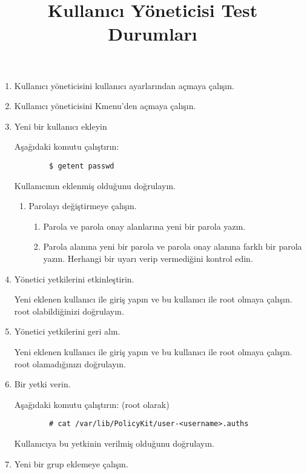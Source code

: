 \documentclass[a4paper,10pt]{article}
\title{Kullanıcı Yöneticisi Test Durumları}
\begin{document}
\maketitle
\begin{enumerate}

\item Kullanıcı yöneticisini kullanıcı ayarlarından açmaya çalışın.

\item Kullanıcı yöneticisini Kmenu'den açmaya çalışın.

\item Yeni bir kullanıcı ekleyin

    Aşağıdaki komutu çalıştırın:
    \begin{verbatim}
        $ getent passwd 
    \end{verbatim}
    Kullanıcının eklenmiş olduğunu doğrulayın.

    \begin{enumerate}
    \item Parolayı değiştirmeye çalışın.
        \begin{enumerate}
        \item Parola ve parola onay alanlarına yeni bir parola yazın.
        \item Parola alanına yeni bir parola ve parola onay alanına farklı bir parola yazın. Herhangi bir uyarı verip vermediğini kontrol edin.
        \end{enumerate}
    \end{enumerate}

    \item Yönetici yetkilerini etkinleştirin.

          Yeni eklenen kullanıcı ile giriş yapın ve bu kullanıcı ile root olmaya çalışın. root olabildiğinizi doğrulayın.
    \item Yönetici yetkilerini geri alın.

        Yeni eklenen kullanıcı ile giriş yapın ve bu kullanıcı ile root olmaya çalışın. root olamadığınızı doğrulayın.

    \item Bir yetki verin.

        Aşağıdaki komutu çalıştırın: (root olarak)
    \begin{verbatim}
        # cat /var/lib/PolicyKit/user-<username>.auths
    \end{verbatim}
        Kullanıcıya bu yetkinin verilmiş olduğunu doğrulayın.

    
\item Yeni bir grup eklemeye çalışın.


\end{enumerate}
\end{document}
